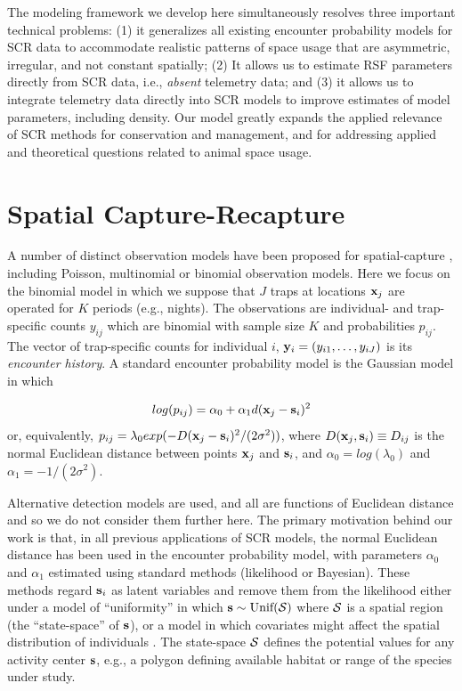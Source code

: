 \documentclass[12pt]{article}
\begin{document}
  The modeling framework we develop here
simultaneously resolves three important technical problems: (1) it
generalizes all existing encounter probability models for SCR data to
accommodate realistic patterns of space usage that are 
asymmetric, irregular, and not constant spatially; (2) It allows us to estimate RSF
parameters directly from SCR data, i.e., {\it absent} telemetry data;
and (3) it allows us to integrate telemetry data directly into SCR
models to improve estimates of model parameters, including density.
Our model greatly expands the applied relevance of SCR methods for
conservation and management, and for addressing applied and
theoretical questions related to animal space usage.



\section{Spatial Capture-Recapture}

A number of distinct observation models have been proposed for
spatial-capture \citep{borchers_efford:2008,
  royle_etal:2009ecol, efford_etal:2009ecol}, including Poisson,
multinomial or binomial observation models. 
Here we focus on the binomial model in which we
suppose that $J$ traps at locations ${\bf x}_{j}$ are operated for $K$
periods (e.g., nights).
The observations are individual- and trap-specific counts $y_{ij}$
which are binomial with sample size $K$ and probabilities
$p_{ij}$. The vector of trap-specific counts for individual $i$,
 ${\bf y}_{i} = (y_{i1},\ldots,y_{iJ})$ is its {\it encounter history}.
A standard encounter probability model
\citep{borchers_efford:2008} is the Gaussian model in which

\begin{equation}
log(p_{ij})= \alpha_{0} + \alpha_{1} d({\bf x}_{j} - {\bf s}_{i})^{2}
\label{eq.encounter}
\end{equation}
or, equivalently, 
$p_{ij} = \lambda_{0} exp(-  D({\bf x}_{j} - {\bf s}_{i})^{2}
/(2\sigma^{2}) )$, where $D({\bf x}_{j},{\bf s}_{i}) \equiv D_{ij}$ is the normal Euclidean
distance between points ${\bf x}_{j}$ and ${\bf s}_{i}$, and 
 $\alpha_{0} = log(\lambda_{0})$ and $\alpha_{1} =
-1/(2\sigma^2)$.

Alternative detection models are used, and all are
functions of Euclidean distance and so we do not consider them
further here.
The primary motivation behind our work is that, in all
previous applications of SCR models, the normal Euclidean distance has been
used in the encounter probability model, with  parameters $\alpha_0$ and $\alpha_1$ 
estimated using standard methods (likelihood or Bayesian). These
methods regard ${\bf s}_{i}$ as latent variables
and remove them from the likelihood either under a
model of ``uniformity'' in which ${\bf s} \sim \mbox{Unif}({\cal
  S})$ where ${\cal S}$ is a spatial region (the ``state-space'' of
${\bf s}$), or a 
model in which covariates might affect the spatial distribution of
individuals \citep{borchers_efford:2008}. The state-space ${\cal S}$
defines the potential values for any activity center ${\bf s}$, e.g., 
a polygon defining available habitat or range of the species under study.
\end{document}
